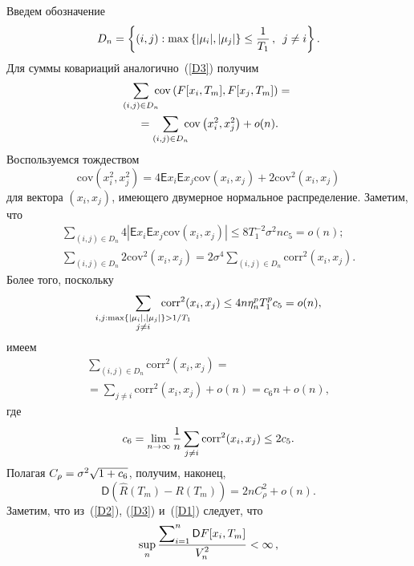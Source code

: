 \begin{multicols}{2}
Введем обозначение 
$$
D_n = \left\{(i,j) : \max\left\{|\mu_i|, |\mu_j|\right\}  \leq \fr{1}{T_1}\,, \enskip j\hm\neq i\right\}.
$$
 Для суммы ковариаций аналогично~(\ref{D3}) получим
\begin{multline*}
\sum\limits_{(i,j)\in D_n} \hspace*{-2mm}\mathrm{cov}\left( F[x_i, T_m], F[x_j, T_m] \right) = {}\\
{}=
\sum\limits_{(i,j)\in D_n} \hspace*{-2mm}\mathrm{cov}\left( x_i^2, x_j^2 \right) + o(n).
\end{multline*}
Воспользуемся тождеством~\cite{Eroshenko}
$$
\mathrm{cov}\left (x_i^2, x_j^2\right) = 4 {\mathsf E} x_i {\mathsf E} x_j \mathrm{cov}\left(x_i, x_j\right) + 2 \mathrm{cov}^2 \left(x_i, x_j\right)
$$
для вектора $(x_i, x_j)$, имеющего двумерное нормальное распределение. Заметим, 
что
\begin{gather*}
 \sum\limits_{(i,j)\in D_n} 4 | {\mathsf E} x_i {\mathsf E} x_j \mathrm{cov}\left(x_i, x_j\right)| \leq 8 T_1^{-2} 
\sigma^2 n c_5 = o(n);
\\
\sum\limits_{(i,j)\in D_n} 2 \mathrm{cov}^2 (x_i, x_j)  = 2\sigma^4 \sum\limits_{(i,j)\in D_n} 
\mathrm{corr}^2 (x_i, x_j). 
\end{gather*}
Более того, поскольку  %
\begin{equation*}
\sum\limits_{\substack{{i,j: \max\{|\mu_i|, |\mu_j|\} > 1/T_1} \\ {j\neq i}}}
\hspace*{-10mm}\mathrm{corr}^2 (x_i, x_j)  
\leq  4 n \eta_n^p T_1^p c_5 =  o(n),
\end{equation*}
имеем
\begin{multline*}
\sum\limits_{(i,j)\in D_n} \mathrm{corr}^2 (x_i, x_j) ={}\\
{}= \sum\limits_{j\neq i} \mathrm{corr}^2 (x_i, x_j) 
+o(n)= c_6 n + o(n),
\end{multline*}
где
$$
c_6 = \lim\limits_{n\to\infty} \displaystyle\frac{\displaystyle 1\mathstrut}{\displaystyle n\mathstrut} \sum\limits_{j\neq i} \mathrm{corr}^2 (x_i, x_j) 
\leq 2 c_5.
$$
Полагая $C_\rho \hm= \sigma^2\sqrt{1 + c_6}$, получим, наконец,
\begin{equation}
\label{D1}
{\mathsf D} \left(\hat{R}(T_m) - R(T_m)\right)  =  2 n C_\rho^2 + o(n).
\end{equation}
Заметим, что из~(\ref{D2}), (\ref{D3}) и~(\ref{D1}) следует, что
\begin{equation}
\label{D5}
\sup\limits_{n} \displaystyle\frac{\displaystyle \sum\nolimits_{i=1}^n {\mathsf D} F[x_i, T_m]\mathstrut}{\displaystyle V_n^2\mathstrut} < \infty\,,
\end{equation}

\end{multicols}
